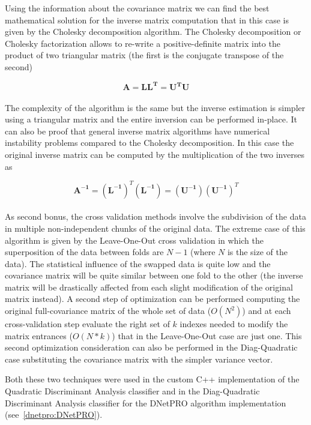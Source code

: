 \documentclass{standalone}
\begin{document}
Using the information about the covariance matrix we can find the best mathematical solution for the inverse matrix computation that in this case is given by the Cholesky decomposition algorithm.
The Cholesky decomposition or Cholesky factorization allows to re-write a positive-definite matrix into the product of two triangular matrix (the first is the conjugate transpose of the second)

$$
\mathbf{A} = \mathbf{LL^T} = \mathbf{U^TU}
$$
\\
The complexity of the algorithm is the same but the inverse estimation is simpler using a triangular matrix and the entire inversion can be performed in-place.
It can also be proof that general inverse matrix algorithms have numerical instability problems compared to the Cholesky decomposition.
In this case the original inverse matrix can be computed by the multiplication of the two inverses as

$$
\mathbf{A^{-1}} = (\mathbf{L^{-1}})^T(\mathbf{L^{-1}}) = (\mathbf{U^{-1}})(\mathbf{U^{-1}})^T
$$
\\
As second bonus, the cross validation methods involve the subdivision of the data in multiple non-independent chunks of the original data.
The extreme case of this algorithm is given by the Leave-One-Out cross validation in which the superposition of the data between folds are $N-1$ (where $N$ is the size of the data).
The statistical influence of the swapped data is quite low and the covariance matrix will be quite similar between one fold to the other (the inverse matrix will be drastically affected from each slight modification of the original matrix instead).
A second step of optimization can be performed computing the original full-covariance matrix of the whole set of data ($O(N^2)$) and at each cross-validation step evaluate the right set of $k$ indexes needed to modify the matrix entrances ($O(N*k)$) that in the Leave-One-Out case are just one.
This second optimization consideration can also be performed in the Diag-Quadratic case substituting the covariance matrix with the simpler variance vector.


Both these two techniques were used in the custom C++ implementation of the Quadratic Discriminant Analysis classifier and in the Diag-Quadratic Discriminant Analysis classifier for the DNetPRO algorithm implementation (see~\ref{dnetpro:DNetPRO}).
\end{document}
